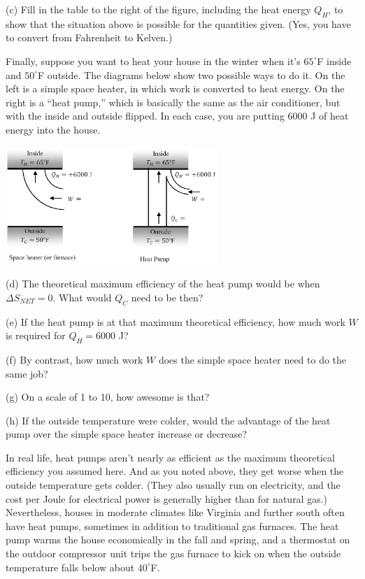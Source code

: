 (c) Fill in the table to the right of the figure, including the heat energy $Q_H$, to show that the situation above is possible for the quantities given.  (Yes, you have to convert from Fahrenheit to Kelven.)
\answerspace{0.2 in}

\pagebreak[2]
Finally, suppose you want to heat your house in the winter when it's $65^\circ$F inside and $50^\circ$F outside.  The diagrams below show two possible ways to do it.  On the left is a simple space heater, in which work is converted to heat energy.  On the right is a ``heat pump,'' which is basically the same as the air conditioner, but with the inside and outside flipped.  In each case, you are putting 6000 J of heat energy into the house.

\begin{center}
\vspace{-0.2 in}
\includegraphics[width=0.6\textwidth]{entropy_is_it_possible/fig7.eps}
\vspace{-0.1 in}
\end{center}

(d) The theoretical maximum efficiency of the heat pump would be when $\Delta S_{NET}=0$.  What would $Q_C$ need to be then?
\answerspace{1.2 in}

(e) If the heat pump is at that maximum theoretical efficiency, how much work $W$ is required for $Q_H = 6000$ J?
 \answerspace{0.6 in}

(f) By contrast, how much work $W$ does the simple space heater need to do the same job? 
\answerspace{0.4 in}

(g) On a scale of 1 to 10, how awesome is that?
\answerspace{0.4 in}

(h) If the outside temperature were colder, would the advantage of the heat pump over the simple space heater increase or decrease? 
\answerspace{0.4 in}

In real life, heat pumps aren't nearly as efficient as the maximum theoretical efficiency you assumed here.  And as you noted above, they get worse when the outside temperature gets colder.  (They also usually run on electricity, and the cost per Joule for electrical power is generally higher than for natural gas.)  Nevertheless, houses in moderate climates like Virginia and further south often have heat pumps, sometimes in addition to traditional gas furnaces.  The heat pump warms the house economically in the fall and spring, and a thermostat on the outdoor compressor unit trips the gas furnace to kick on when the outside temperature falls below about $40^\circ$F.

